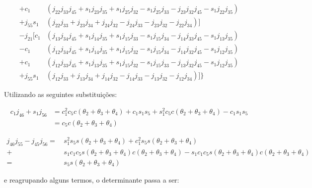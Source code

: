 \begin{align*}
                   +c_1&(j_{22}j_{33}j_{45}+s_1j_{23}j_{35}+s_1j_{25}j_{32}-s_1j_{25}j_{33}-j_{23}j_{32}j_{45}-s_1j_{22}j_{35}) \\
                +j_{55}s_1&(j_{22}j_{33}+j_{23}j_{34}+j_{24}j_{32}-j_{24}j_{33}-j_{23}j_{32}-j_{22}j_{34})] \\
            -j_{21}[c_1&(j_{13}j_{34}j_{45}+s_1j_{14}j_{35}+s_1j_{15}j_{33}-s_1j_{15}j_{34}-j_{14}j_{33}j_{45}-s_1j_{13}j_{35}) \\
                   -c_1&(j_{12}j_{34}j_{45}+s_1j_{14}j_{35}+s_1j_{15}j_{32}-s_1j_{15}j_{34}-j_{14}j_{32}j_{45}-s_1j_{12}j_{35}) \\
                   +c_1&(j_{12}j_{33}j_{45}+s_1j_{13}j_{35}+s_1j_{15}j_{32}-s_1j_{15}j_{33}-j_{13}j_{32}j_{45}-s_1j_{12}j_{35}) \\
                +j_{55}s_1&(j_{12}j_{33}+j_{13}j_{34}+j_{14}j_{32}-j_{14}j_{33}-j_{13}j_{32}-j_{12}j_{34})]\}                 
\end{align*}

Utilizando as seguintes substituições:

\begin{align*}
    c_1j_{46}+s_1j_{56} &= c_1^2c_5c(\theta_2+\theta_3+\theta_4)+c_1s_1s_5+s_1^2c_5c(\theta_2+\theta_3+\theta_4)-c_1s_1s_5 \\
                        &= c_5c(\theta_2+\theta_3+\theta_4)
\end{align*}

\begin{align*}
    j_{46}j_{55}-j_{45}j_{56} = \, &s_1^2s_5s(\theta_2+\theta_3+\theta_4)+c_1^2s_5s(\theta_2+\theta_3+\theta_4) \\
                                  +&s_1c_1c_5s(\theta_2+\theta_3+\theta_4)c(\theta_2+\theta_3+\theta_4)-s_1c_1c_5s(\theta_2+\theta_3+\theta_4)c(\theta_2+\theta_3+\theta_4)\\
                              = \, &s_5s(\theta_2+\theta_3+\theta_4)
\end{align*}

e reagrupando alguns termos, o determinante passa a ser:

